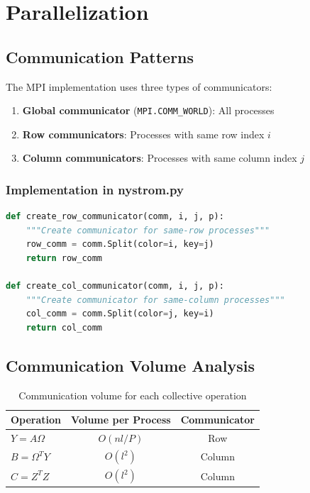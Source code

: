 \documentclass[11pt,a4paper]{article}
\begin{document}
\section{Parallelization}

\subsection{Communication Patterns}

The MPI implementation uses three types of communicators:

\begin{enumerate}
    \item \textbf{Global communicator} (\texttt{MPI.COMM\_WORLD}): All processes
    \item \textbf{Row communicators}: Processes with same row index $i$
    \item \textbf{Column communicators}: Processes with same column index $j$
\end{enumerate}

\subsubsection{Implementation in nystrom.py}

\begin{lstlisting}[language=Python, caption={Communicator creation}]
def create_row_communicator(comm, i, j, p):
    """Create communicator for same-row processes"""
    row_comm = comm.Split(color=i, key=j)
    return row_comm

def create_col_communicator(comm, i, j, p):
    """Create communicator for same-column processes"""
    col_comm = comm.Split(color=j, key=i)
    return col_comm
\end{lstlisting}

\subsection{Communication Volume Analysis}

\begin{table}[h]
\centering
\begin{tabular}{@{}lcc@{}}
\toprule
Operation & Volume per Process & Communicator \\
\midrule
$Y = A\Omega$ & $O(nl/P)$ & Row \\
$B = \Omega^T Y$ & $O(l^2)$ & Column \\
$C = Z^T Z$ & $O(l^2)$ & Column \\
\bottomrule
\end{tabular}
\caption{Communication volume for each collective operation}
\label{tab:comm_volume}
\end{table}
\end{document}
